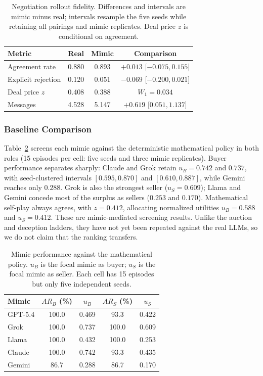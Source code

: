 \documentclass[conference]{IEEEtran}
\begin{document}
\begin{table}[htbp]
\caption{Negotiation rollout fidelity. Differences and intervals are mimic minus real; intervals resample the five seeds while retaining all pairings and mimic replicates. Deal price $z$ is conditional on agreement.}
\label{tab:neg_fidelity}
\centering
\begin{tabular}{lccc}
\hline
Metric & Real & Mimic & Comparison \\
\hline
Agreement rate & 0.880 & 0.893 & $+0.013$ [$-0.075,0.155$] \\
Explicit rejection & 0.120 & 0.051 & $-0.069$ [$-0.200,0.021$] \\
Deal price $z$ & 0.408 & 0.388 & $W_1=0.034$ \\
Messages & 4.528 & 5.147 & $+0.619$ [$0.051,1.137$] \\
\hline
\end{tabular}
\end{table}

\subsubsection{Baseline Comparison}

Table~\ref{tab:neg_baseline} screens each mimic against the deterministic mathematical policy in both roles (15 episodes per cell: five seeds and three mimic replicates). Buyer performance separates sharply: Claude and Grok retain $u_B=0.742$ and $0.737$, with seed-clustered intervals $[0.595,0.870]$ and $[0.610,0.887]$, while Gemini reaches only $0.288$. Grok is also the strongest seller ($u_S=0.609$); Llama and Gemini concede most of the surplus as sellers ($0.253$ and $0.170$). Mathematical self-play always agrees, with $z=0.412$, allocating normalized utilities $u_B=0.588$ and $u_S=0.412$. These are mimic-mediated screening results. Unlike the auction and deception ladders, they have not yet been repeated against the real LLMs, so we do not claim that the ranking transfers.

\begin{table}[htbp]
\caption{Mimic performance against the mathematical policy. $u_B$ is the focal mimic as buyer; $u_S$ is the focal mimic as seller. Each cell has 15 episodes but only five independent seeds.}
\label{tab:neg_baseline}
\centering
\begin{tabular}{lcccc}
\hline
Mimic & $AR_B$ (\%) & $u_B$ & $AR_S$ (\%) & $u_S$ \\
\hline
GPT-5.4 & 100.0 & 0.469 & 93.3 & 0.422 \\
Grok    & 100.0 & 0.737 & 100.0 & 0.609 \\
Llama   & 100.0 & 0.432 & 100.0 & 0.253 \\
Claude  & 100.0 & 0.742 & 93.3 & 0.435 \\
Gemini  & 86.7 & 0.288 & 86.7 & 0.170 \\
\hline
\end{tabular}
\end{table}
\end{document}
